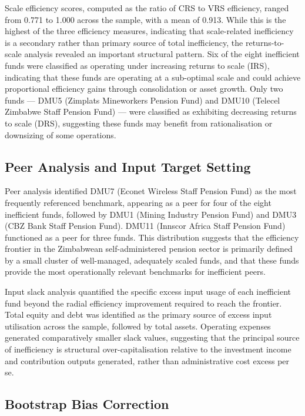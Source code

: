 \documentclass[12pt,a4paper]{article}
\begin{document}
Scale efficiency scores, computed as the ratio of CRS to VRS efficiency, ranged from 0.771 to 1.000 across the sample, with a mean of 0.913. While this is the highest of the three efficiency measures, indicating that scale-related inefficiency is a secondary rather than primary source of total inefficiency, the returns-to-scale analysis revealed an important structural pattern. Six of the eight inefficient funds were classified as operating under increasing returns to scale (IRS), indicating that these funds are operating at a sub-optimal scale and could achieve proportional efficiency gains through consolidation or asset growth. Only two funds --- DMU5 (Zimplats Mineworkers Pension Fund) and DMU10 (Telecel Zimbabwe Staff Pension Fund) --- were classified as exhibiting decreasing returns to scale (DRS), suggesting these funds may benefit from rationalisation or downsizing of some operations.

\subsection{Peer Analysis and Input Target Setting}

Peer analysis identified DMU7 (Econet Wireless Staff Pension Fund) as the most frequently referenced benchmark, appearing as a peer for four of the eight inefficient funds, followed by DMU1 (Mining Industry Pension Fund) and DMU3 (CBZ Bank Staff Pension Fund). DMU11 (Innscor Africa Staff Pension Fund) functioned as a peer for three funds. This distribution suggests that the efficiency frontier in the Zimbabwean self-administered pension sector is primarily defined by a small cluster of well-managed, adequately scaled funds, and that these funds provide the most operationally relevant benchmarks for inefficient peers.

Input slack analysis quantified the specific excess input usage of each inefficient fund beyond the radial efficiency improvement required to reach the frontier. Total equity and debt was identified as the primary source of excess input utilisation across the sample, followed by total assets. Operating expenses generated comparatively smaller slack values, suggesting that the principal source of inefficiency is structural over-capitalisation relative to the investment income and contribution outputs generated, rather than administrative cost excess per se.

\subsection{Bootstrap Bias Correction}
\end{document}
